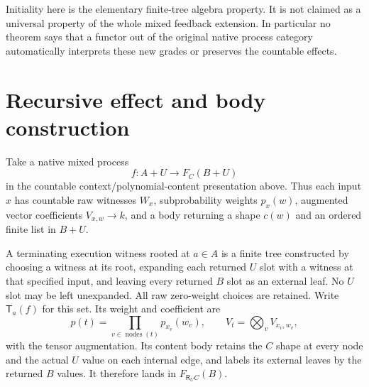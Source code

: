 \documentclass[11pt]{article}
\newcommand{\R}{\mathsf R}\newcommand{\Col}{\mathsf{Col}}\newcommand{\Vect}{\mathbf{Vect}_k}
\begin{document}
Initiality here is the elementary finite-tree algebra property. It is not claimed as a universal property of the whole mixed feedback extension. In particular no theorem says that a functor out of the original native process category automatically interprets these new grades or preserves the countable effects.

\section{Recursive effect and body construction}
Take a native mixed process
\[
 f:A+U\longrightarrow F_C(B+U)
\]
in the countable context/polynomial-content presentation above. Thus each input $x$ has countable raw witnesses $W_x$, subprobability weights $p_x(w)$, augmented vector coefficients $V_{x,w}\to k$, and a body returning a shape $c(w)$ and an ordered finite list in $B+U$.

A terminating execution witness rooted at $a\in A$ is a finite tree constructed by choosing a witness at its root, expanding each returned $U$ slot with a witness at that specified input, and leaving every returned $B$ slot as an external leaf. No $U$ slot may be left unexpanded. All raw zero-weight choices are retained. Write $\mathsf T_a(f)$ for this set. Its weight and coefficient are
\[
 p(t)=\prod_{v\in\operatorname{nodes}(t)}p_{x_v}(w_v),
 \qquad V_t=\bigotimes_v V_{x_v,w_v},
\]
with the tensor augmentation. Its content body retains the $C$ shape at every node and the actual $U$ value on each internal edge, and labels its external leaves by the returned $B$ values. It therefore lands in $F_{\R_U C}(B)$.
\end{document}
